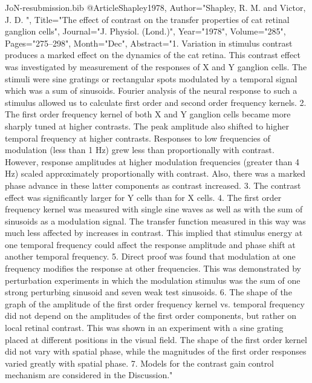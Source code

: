 \documentclass{article}
\begin{document}
\begin{filecontents}{JoN-resubmission.bib}
@Article{Shapley1978,
   Author="Shapley, R. M.  and Victor, J. D. ",
   Title="{{T}he effect of contrast on the transfer properties of cat retinal ganglion cells}",
   Journal="J. Physiol. (Lond.)",
   Year="1978",
   Volume="285",
   Pages="275--298",
   Month="Dec",
   Abstract="1. Variation in stimulus contrast produces a marked
effect on the dynamics of the cat retina. This contrast effect was
investigated by measurement of the responses of X and Y ganglion
cells. The stimuli were sine gratings or rectangular spots modulated
by a temporal signal which was a sum of sinusoids. Fourier analysis of
the neural response to such a stimulus allowed us to calculate first
order and second order frequency kernels. 2. The first order frequency
kernel of both X and Y ganglion cells became more sharply tuned at
higher contrasts. The peak amplitude also shifted to higher temporal
frequency at higher contrasts. Responses to low frequencies of
modulation (less than 1 Hz) grew less than proportionally with
contrast. However, response amplitudes at higher modulation
frequencies (greater than 4 Hz) scaled approximately proportionally
with contrast. Also, there was a marked phase advance in these latter
components as contrast increased. 3. The contrast effect was
significantly larger for Y cells than for X cells. 4. The first order
frequency kernel was measured with single sine waves as well as with
the sum of sinusoids as a modulation signal. The transfer function
measured in this way was much less affected by increases in
contrast. This implied that stimulus energy at one temporal frequency
could affect the response amplitude and phase shift at another
temporal frequency. 5. Direct proof was found that modulation at one
frequency modifies the response at other frequencies. This was
demonstrated by perturbation experiments in which the modulation
stimulus was the sum of one strong perturbing sinusoid and seven weak
test sinusoids. 6. The shape of the graph of the amplitude of the
first order frequency kernel vs. temporal frequency did not depend on
the amplitudes of the first order components, but rather on local
retinal contrast. This was shown in an experiment with a sine grating
placed at different positions in the visual field. The shape of the
first order kernel did not vary with spatial phase, while the
magnitudes of the first order responses varied greatly with spatial
phase. 7. Models for the contrast gain control mechanism are
considered in the Discussion."  }


\end{filecontents}
\end{document}
